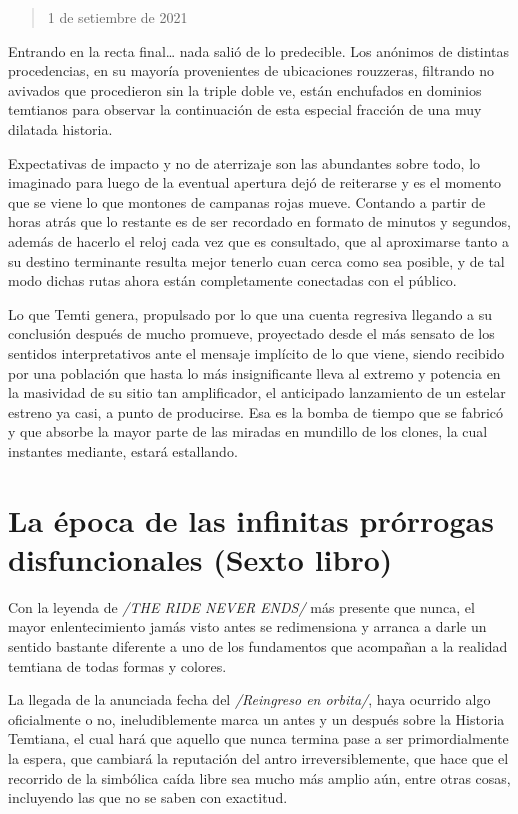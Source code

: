 \documentclass[
]{book}
\begin{document}
\begin{quote}
1 de setiembre de 2021
\end{quote}

Entrando en la recta final\ldots{} nada salió de lo predecible. Los anónimos de distintas procedencias, en su mayoría provenientes de ubicaciones rouzzeras, filtrando no avivados que procedieron sin la triple doble ve, están enchufados en dominios temtianos para observar la continuación de esta especial fracción de una muy dilatada historia.

Expectativas de impacto y no de aterrizaje son las abundantes sobre todo, lo imaginado para luego de la eventual apertura dejó de reiterarse y es el momento que se viene lo que montones de campanas rojas mueve. Contando a partir de horas atrás que lo restante es de ser recordado en formato de minutos y segundos, además de hacerlo el reloj cada vez que es consultado, que al aproximarse tanto a su destino terminante resulta mejor tenerlo cuan cerca como sea posible, y de tal modo dichas rutas ahora están completamente conectadas con el público.

Lo que Temti genera, propulsado por lo que una cuenta regresiva llegando a su conclusión después de mucho promueve, proyectado desde el más sensato de los sentidos interpretativos ante el mensaje implícito de lo que viene, siendo recibido por una población que hasta lo más insignificante lleva al extremo y potencia en la masividad de su sitio tan amplificador, el anticipado lanzamiento de un estelar estreno ya casi, a punto de producirse. Esa es la bomba de tiempo que se fabricó y que absorbe la mayor parte de las miradas en mundillo de los clones, la cual instantes mediante, estará estallando.

\hypertarget{la-uxe9poca-de-las-infinitas-pruxf3rrogas-disfuncionales-sexto-libro}{%
\chapter{La época de las infinitas prórrogas disfuncionales (Sexto libro)}\label{la-uxe9poca-de-las-infinitas-pruxf3rrogas-disfuncionales-sexto-libro}}

Con la leyenda de \emph{/THE RIDE NEVER ENDS/} más presente que nunca, el mayor enlentecimiento jamás visto antes se redimensiona y arranca a darle un sentido bastante diferente a uno de los fundamentos que acompañan a la realidad temtiana de todas formas y colores.

La llegada de la anunciada fecha del \emph{/Reingreso en orbita/}, haya ocurrido algo oficialmente o no, ineludiblemente marca un antes y un después sobre la Historia Temtiana, el cual hará que aquello que nunca termina pase a ser primordialmente la espera, que cambiará la reputación del antro irreversiblemente, que hace que el recorrido de la simbólica caída libre sea mucho más amplio aún, entre otras cosas, incluyendo las que no se saben con exactitud.
\end{document}
